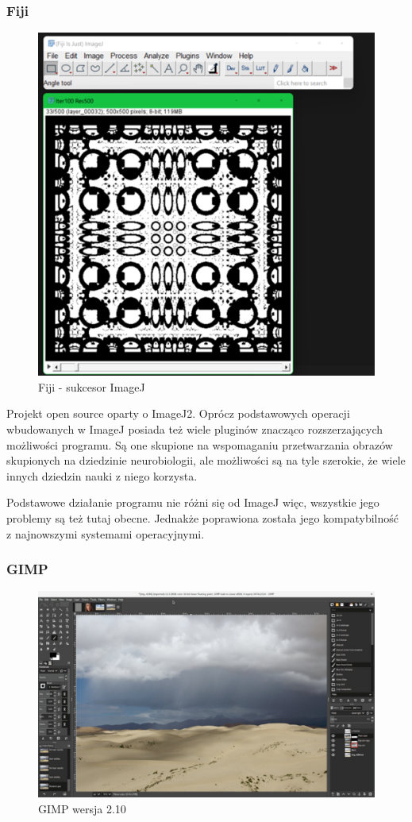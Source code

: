 \subsubsection{Fiji}
\begin{figure}[H]
    \centering
    \includegraphics[width=0.8\linewidth]{./images/Picture4.png}
    \caption{Fiji - sukcesor ImageJ}
    \label{fig:fiji}
\end{figure}

Projekt open source oparty o ImageJ2. Oprócz podstawowych operacji wbudowanych w ImageJ posiada też wiele pluginów znacząco rozszerzających możliwości programu. 
Są one skupione na wspomaganiu przetwarzania obrazów skupionych na dziedzinie neurobiologii, ale możliwości są na tyle szerokie, że wiele innych dziedzin nauki z niego korzysta.

Podstawowe działanie programu nie różni się od ImageJ więc, wszystkie jego problemy są też tutaj obecne. Jednakże poprawiona została jego kompatybilność z najnowszymi systemami operacyjnymi.

\subsubsection{GIMP}
\begin{figure}[H]
    \centering
    \includegraphics{./images/Picture5.jpg}
    \caption{GIMP wersja 2.10}
    \label{fig:gimp}
\end{figure}

